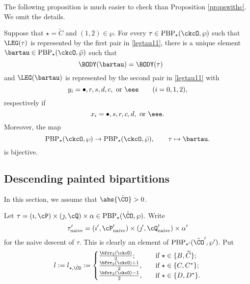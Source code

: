 \documentclass[ssunip]{subfiles}
\begin{document}

The following proposition is much easier to check than Proposition \ref{propswithc}. We omit the details. 
\begin{prop}\label{propswithc2}
Suppose that $\star=\widetilde C$ and $(1,2)\in \wp$. For every $\tau\in \mathrm{PBP}_\star(\ckcO,\wp ) $ such that $\LEG(\tau)$ is represented by the first pair  in \eqref{legtau11}, there is a unique element $\bartau\in \mathrm{PBP}_\star(\ckcO,\bar \wp ) $ such that 
 \[
    \BODY(\bartau) = \BODY(\tau) \qquad 
\]
and $\LEG(\bartau)$ is represented by the second pair  in \eqref{legtau11} with
\[
y_i = \bullet,r,s,d,c, \text{ or }\eee\qquad (i=0,1,2),
\]
respectively if 
\[
x_i = \bullet,s,r,c,d, \text{ or }\eee.  %
\]
Moreover, the map 
\[
 \mathrm{PBP}_\star(\ckcO,\wp)\rightarrow \mathrm{PBP}_\star(\ckcO,\bar \wp), \qquad
 \tau \mapsto \bartau. 
 \]
 is bijective.
\end{prop}




 \subsection{Descending painted bipartitions}\label{sec:desc}
 
 In this section, we assume that $\abs{\check \CO}>0$.

Let 
$
\tau=(\imath,\cP)\times(\jmath,\cQ)\times \alpha \in  \mathrm{PBP}_\star(\check \CO,\wp).
$
Write 
\[
  \tau'_{\mathrm{naive}}=(\imath', \cP'_{\mathrm{naive}})\times (\jmath', \cQ'_{\mathrm{naive}})\times \alpha'
\]
for the naive descent of $\tau$. This is clearly an element of $  \mathrm{PBP}_{\star'}(\check \CO',\wp')$. Put
\begin{equation}\label{lstarco}
  l:=l_{\star, \check \CO}:=\begin{cases}
 \frac{\bfrr_2(\ckcO)}{2}; & \quad \textrm{if } \star\in \{B, \widetilde C\};\\
 \frac{\bfrr_2(\ckcO)+1}{2}, &\quad \textrm{if } \star\in \{C, C^* \};\\
 \frac{\bfrr_2(\ckcO)-1}{2}, &\quad \textrm{if } \star\in \{ D, D^*\}.\\
\end{cases}
\end{equation}
\end{document}
